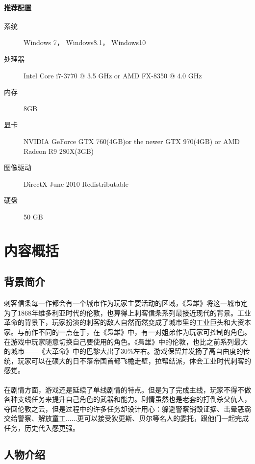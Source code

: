 \documentclass{article} \usepackage{CJK}
\begin{document}
    \paragraph{推荐配置}
    \begin{description}
      \item[系统] Windows 7， Windows8.1， Windows10
      \item[处理器] Intel Core i7-3770 @ 3.5 GHz or AMD FX-8350 @ 4.0 GHz
      \item[内存] 8GB
      \item[显卡] NVIDIA GeForce GTX 760(4GB)or the newer GTX 970(4GB) or AMD Radeon R9 280X(3GB)
      \item[图像驱动] DirectX June 2010 Redistributable
      \item[硬盘] 50 GB
    \end{description}
\section{内容概括}
\subsection{背景简介}
    \paragraph{}刺客信条每一作都会有一个城市作为玩家主要活动的区域，《枭雄》将这一城市定为了1868年维多利亚时代的伦敦，也算得上刺客信条系列最接近现代的背景。工业革命的背景下，玩家扮演的刺客的敌人自然而然变成了城市里的工业巨头和大资本家。与前作不同的一点在于，在《枭雄》中，有一对姐弟作为玩家可控制的角色。在游戏中玩家随意切换自己要使用的角色。《枭雄》中的伦敦，也比之前系列最大的城市——《大革命》中的巴黎大出了30\%左右。游戏保留并发扬了高自由度的传统，玩家可以在硕大的日不落帝国首都飞檐走壁，拉帮结派，体会工业时代刺客的感觉。
    \paragraph{}在剧情方面，游戏还是延续了单线剧情的特点。但是为了完成主线，玩家不得不做各种支线任务来提升自己角色的武器和能力。剧情虽然也是老套的打倒杀父仇人，夺回伦敦之云，但是过程中的许多任务却设计用心：躲避警察销毁证据、击晕恶霸交给警察、解放童工......更可以接受狄更斯、贝尔等名人的委托，跟他们一起完成任务，历史代入感更强。
\subsection{人物介绍}
\end{document}
